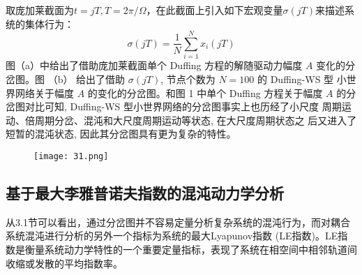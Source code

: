 取庞加莱截面为$t=j T, T=2 \pi / \Omega$，在此截面上引入如下宏观变量$\sigma(j T)$来描述系统的集体行为：
\begin{equation}
    \sigma(j T)=\frac{1}{N} \sum_{i=1}^N x_i(j T)
\end{equation}
图（a）中给出了借助庞加莱截面单个 Duffing 方程的解随驱动力幅度 $A$ 变化的分岔图。图 （b） 给出了借助 $\sigma(j T)$, 
节点个数为 $N=100$ 的 Duffing-WS 型 小世界网络关于幅度 $A$ 的变化的分岔图。和图 1 中单个 Duffing 方程关于幅度 $A$ 
的分岔图对比可知, Duffing-WS 型小世界网络的分岔图事实上也历经了小尺度 周期运动、倍周期分岔、混沌和大尺度周期运动等状态,
 在大尺度周期状态之 后又进入了短暂的混沌状态, 因此其分岔图具有更为复杂的特性。
 \begin{figure}[!htbp]
    \centering
    \texttt{[image: 31.png]}
 \end{figure}
\subsection{基于最大李雅普诺夫指数的混沌动力学分析}
从3.1节可以看出，通过分岔图并不容易定量分析复杂系统的混沌行为，而对耦合系统混沌进行分析的另外一个指标为系统的最大Lyapunov指数
(LE指数)。LE指数是衡量系统动力学特性的一个重要定量指标，表现了系统在相空间中相邻轨道间收缩或发散的平均指数率。

